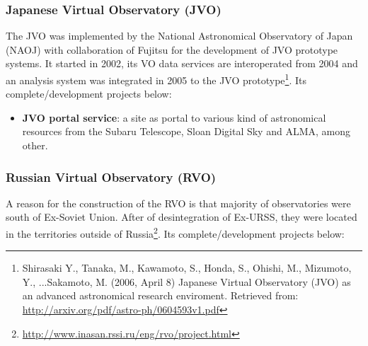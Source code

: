 \subsubsection{Japanese Virtual Observatory (JVO)}
The JVO \cite{website:jvo-home} \nocite{IshiharaMizumotoOhishiKawaray2004} was
implemented by the National Astronomical Observatory of Japan (NAOJ) with
collaboration of Fujitsu for the development of JVO prototype systems. It
started in 2002, its VO data services are interoperated from 2004 and an
analysis system was integrated in 2005 to the JVO prototype\footnote{Shirasaki
Y., Tanaka, M., Kawamoto, S., Honda, S., Ohishi, M., Mizumoto, Y., ...Sakamoto,
M. (2006, April 8) Japanese Virtual Observatory (JVO) as an advanced
astronomical research enviroment. Retrieved from:
\url{http://arxiv.org/pdf/astro-ph/0604593v1.pdf}}. Its complete/development
projects below:

\begin{itemize}
\item \textbf{JVO portal service}:
a site as portal to various kind of astronomical resources from the Subaru
Telescope, Sloan Digital Sky and ALMA, among other.
\end{itemize}

\subsubsection{Russian Virtual Observatory (RVO)}
A reason for the construction of the RVO \cite{website:rvo-home} is that
majority of observatories were south of Ex-Soviet Union. After of desintegration
of Ex-URSS, they were located in the territories outside of
Russia\footnote{\url{http://www.inasan.rssi.ru/eng/rvo/project.html}}. Its
complete/development projects below:

